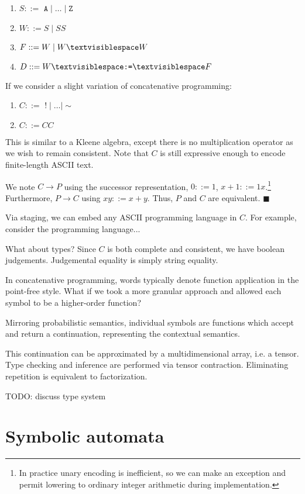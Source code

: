 \documentclass[11pt]{article}
\begin{document}
\begin{enumerate}
  \item $S ::= $ $\texttt{A} \mid \ldots \mid \texttt{Z}$
  \item $W ::= S \mid SS$
  \item $F ::= W \mid W \textvisiblespace W$
  \item $D ::= W \textvisiblespace\texttt{:=}\textvisiblespace F$
\end{enumerate}

If we consider a slight variation of concatenative programming:

\begin{enumerate}
  \item $C ::= $ $! \mid \ldots \mid \sim$
  \item $C ::= CC$
\end{enumerate}

This is similar to a Kleene algebra, except there is no multiplication operator as we wish to remain consistent. Note that $C$ is still expressive enough to encode finite-length ASCII text.

We note $C → P$ using the successor representation, $0 ::= 1$, $x+1 ::= 1x$.\footnote{In practice unary encoding is inefficient, so we can make an exception and permit lowering to ordinary integer arithmetic during implementation.} Furthermore, $P \rightarrow C$ using $xy ::= x+y$. Thus, $P$ and $C$ are equivalent. $\blacksquare$

Via staging, we can embed any ASCII programming language in $C$. For example, consider the programming language...

What about types? Since $C$ is both complete and consistent, we have boolean judgements. Judgemental equality is simply string equality.

In concatenative programming, words typically denote function application in the point-free style. What if we took a more granular approach and allowed each symbol to be a higher-order function?

Mirroring probabilistic semantics, individual symbols are functions which accept and return a continuation, representing the contextual semantics.

This continuation can be approximated by a multidimensional array, i.e. a tensor. Type checking and inference are performed via tensor contraction. Eliminating repetition is equivalent to factorization.

TODO: discuss type system

\pagebreak
  \section{Symbolic automata}
\end{document}
